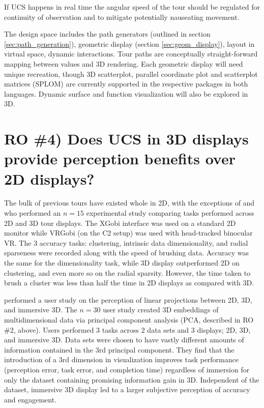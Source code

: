 \documentclass{monashthesis}
\begin{document}
If UCS happens in real time the angular speed of the tour should be
regulated for continuity of observation and to mitigate potentially
nauseating movement.

The design space includes the path generators (outlined in section
\ref{sec:path_generation}), geometric display (section
\ref{sec:geom_display}), layout in virtual space, dynamic interactions.
Tour paths are conceptually straight-forward mapping between values and
3D rendering. Each geometric display will need unique recreation, though
3D scatterplot, parallel coordinate plot and scatterplot matrices
(SPLOM) are currently supported in the respective packages in both
languages. Dynamic surface and function visualization will also be
explored in 3D.

\section{RO \#4) Does UCS in 3D displays provide perception benefits
over 2D displays?}\label{UCS_3dvs2d}

The bulk of previous tours have existed whole in 2D, with the exceptions
of \textcite{nelson_xgobi_1998} and \textcite{arms_benefits_1999} who
performed an \(n=15\) experimental study comparing tasks performed
across 2D and 3D tour displays. The XGobi interface was used on a
standard 2D monitor while VRGobi (on the C2 setup) was used with
head-tracked binocular VR. The 3 accuracy tasks: clustering, intrinsic
data dimensionality, and radial sparseness were recorded along with the
speed of brushing data. Accuracy was the same for the dimensionality
task, while 3D display outperformed 2D on clustering, and even more so
on the radial sparsity. However, the time taken to brush a cluster was
less than half the time in 2D displays as compared with 3D.

\textcite{wagner_filho_immersive_2018} performed a user study on the
perception of linear projections between 2D, 3D, and immersive 3D. The
\(n=30\) user study created 3D embeddings of multidimensional data via
principal component analysis (PCA, described in RO \#2, above). Users
performed 3 tasks across 2 data sets and 3 displays; 2D, 3D, and
immersive 3D. Data sets were chosen to have vastly different amounts of
information contained in the 3rd principal component. They find that the
introduction of a 3rd dimension in visualization improves task
performance (perception error, task error, and completion time)
regardless of immersion for only the dataset containing promising
information gain in 3D. Independent of the dataset, immersive 3D display
led to a larger subjective perception of accuracy and engagement.
\end{document}
